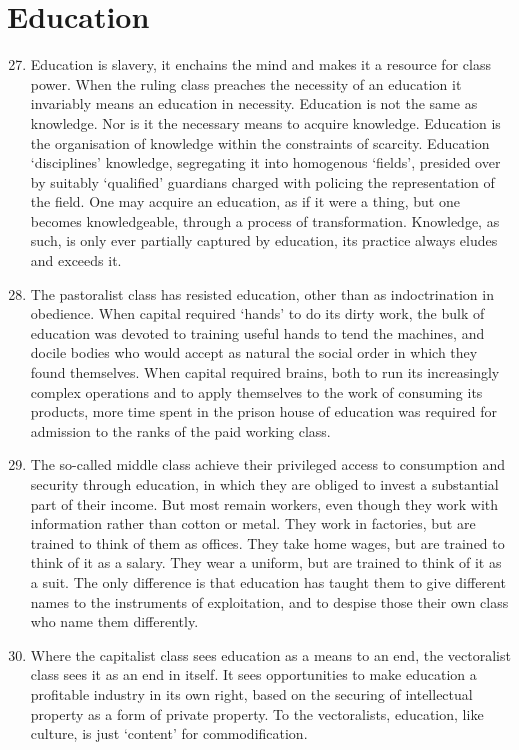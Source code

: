 \documentclass[letterpaper,12pt,english]{sphinxmanual}
\begin{document}
\section{Education}
\label{wark:education}\begin{enumerate}
\setcounter{enumi}{26}
\item {} 
Education is slavery, it enchains the mind and makes it a resource for class power. When the ruling class preaches the necessity of an education it invariably means an education in necessity. Education is not the same as knowledge. Nor is it the necessary means to acquire knowledge. Education is the organisation of knowledge within the constraints of scarcity. Education `disciplines' knowledge, segregating it into homogenous `fields', presided over by suitably `qualified' guardians charged with policing the representation of the field. One may acquire an education, as if it were a thing, but one becomes knowledgeable, through a process of transformation. Knowledge, as such, is only ever partially captured by education, its practice always eludes and exceeds it.

\item {} 
The pastoralist class has resisted education, other than as indoctrination in obedience. When capital required `hands' to do its dirty work, the bulk of education was devoted to training useful hands to tend the machines, and docile bodies who would accept as natural the social order in which they found themselves. When capital required brains, both to run its increasingly complex operations and to apply themselves to the work of consuming its products, more time spent in the prison house of education was required for admission to the ranks of the paid working class.

\item {} 
The so-called middle class achieve their privileged access to consumption and security through education, in which they are obliged to invest a substantial part of their income. But most remain workers, even though they work with information rather than cotton or metal. They work in factories, but are trained to think of them as offices. They take home wages, but are trained to think of it as a salary. They wear a uniform, but are trained to think of it as a suit. The only difference is that education has taught them to give different names to the instruments of exploitation, and to despise those their own class who name them differently.

\item {} 
Where the capitalist class sees education as a means to an end, the vectoralist class sees it as an end in itself. It sees opportunities to make education a profitable industry in its own right, based on the securing of intellectual property as a form of private property. To the vectoralists, education, like culture, is just `content' for commodification.


\end{enumerate}
\end{document}
